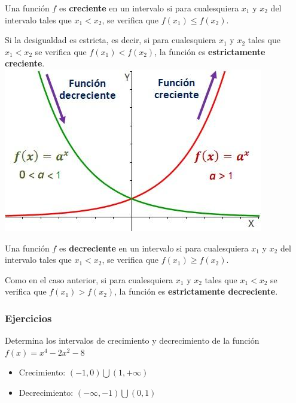 \begin{definition}
	Una función $f$ es \textbf{creciente} en un intervalo si para cualesquiera $x_1$ y $x_2$ del intervalo tales que $x_{1} < x_{2}$, se verifica que $f(x_{1}) \leq f(x_{2})$.
\end{definition}
Si la desigualdad es estricta, es decir, si para cualesquiera $x_1$ y $x_2$ tales que $x_1 < x_2$ se verifica que $f(x_{1}) < f(x_{2})$, la función es \textbf{estrictamente creciente}.\\
\newline
\includegraphics{samples/propiedades/crecienteDecreciente.jpg}\\
\begin{definition}
	Una función $f$ es \textbf{decreciente} en un intervalo si para cualesquiera $x_1$ y $x_2$ del intervalo tales que $x_{1} < x_{2}$, se verifica que $f(x_{1}) \geq f(x_{2})$.	
\end{definition}
Como en el caso anterior, si para cualesquiera $x_1$ y $x_2$ tales que $x_{1} < x_{2}$ se verifica que $f(x_{1}) > f(x_{2})$, la función es \textbf{estrictamente decreciente}.\\
\subsubsection{Ejercicios}

\begin{ex}
	Determina los intervalos de crecimiento y decrecimiento de la función $f(x)=x^4-2x^2-8$
	\begin{sol}
		\begin{itemize}
			\item Crecimiento: $(-1,0) \bigcup (1,+\infty)$
			\item Decrecimiento: $(-\infty, -1) \bigcup (0,1)$
		\end{itemize}
	\end{sol}
\end{ex}

